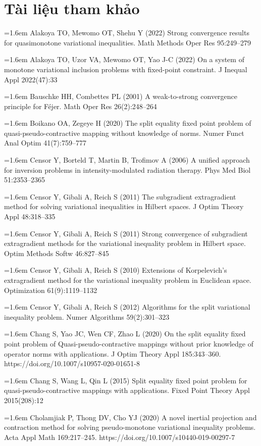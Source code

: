 \documentclass{MyBook}
\theoremstyle{plain}
\theoremstyle{definition}
\theoremstyle{remark}
\numberwithin{equation}{chapter}
\begin{document}
\chapter*{Tài liệu tham khảo}
{\small
\setlength{\parindent}{0pt}
\newcommand{\refitem}[1]{\par\hangindent=1.6em #1\par\vspace{2pt}}

\refitem{Alakoya TO, Mewomo OT, Shehu Y (2022) Strong convergence results for quasimonotone variational inequalities. Math Methods Oper Res 95:249--279}
\refitem{Alakoya TO, Uzor VA, Mewomo OT, Yao J-C (2022) On a system of monotone variational inclusion problems with fixed-point constraint. J Inequal Appl 2022(47):33}
\refitem{Bauschke HH, Combettes PL (2001) A weak-to-strong convergence principle for Féjer. Math Oper Res 26(2):248--264}
\refitem{Boikano OA, Zegeye H (2020) The split equality fixed point problem of quasi-pseudo-contractive mapping without knowledge of norms. Numer Funct Anal Optim 41(7):759--777}
\refitem{Censor Y, Borteld T, Martin B, Trofimov A (2006) A unified approach for inversion problems in intensity-modulated radiation therapy. Phys Med Biol 51:2353--2365}
\refitem{Censor Y, Gibali A, Reich S (2011) The subgradient extragradient method for solving variational inequalities in Hilbert spaces. J Optim Theory Appl 48:318--335}
\refitem{Censor Y, Gibali A, Reich S (2011) Strong convergence of subgradient extragradient methods for the variational inequality problem in Hilbert space. Optim Methods Softw 46:827--845}
\refitem{Censor Y, Gibali A, Reich S (2010) Extensions of Korpelevich's extragradient method for the variational inequality problem in Euclidean space. Optimization 61(9):1119--1132}
\refitem{Censor Y, Gibali A, Reich S (2012) Algorithms for the split variational inequality problem. Numer Algorithms 59(2):301--323}
\refitem{Chang S, Yao JC, Wen CF, Zhao L (2020) On the split equality fixed point problem of Quasi-pseudo-contractive mappings without prior knowledge of operator norms with applications. J Optim Theory Appl 185:343--360. https://doi.org/10.1007/s10957-020-01651-8}
\refitem{Chang S, Wang L, Qin L (2015) Split equality fixed point problem for quasi-pseudo-contractive mappings with applications. Fixed Point Theory Appl 2015(208):12}
\refitem{Cholamjiak P, Thong DV, Cho YJ (2020) A novel inertial projection and contraction method for solving pseudo-monotone variational inequality problems. Acta Appl Math 169:217--245. https://doi.org/10.1007/s10440-019-00297-7}
}
\end{document}
